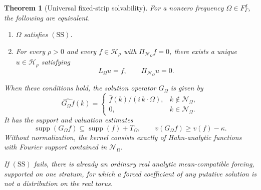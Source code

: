 \documentclass[11pt,letterpaper]{article}
\newtheorem{theorem}{Theorem}[section]
\theoremstyle{definition}
\theoremstyle{remark}
\newcommand{\HH}{\mathcal H}
\newcommand{\supp}{\operatorname{supp}}
\newcommand{\Lom}{L_{\Omega}}
\newcommand{\Gom}{G_{\Omega}}
\newcommand{\res}{\mathcal N_{\Omega}}
\newcommand{\SDcond}{\mathrm{SS}}
\numberwithin{equation}{section}
\begin{document}
\begin{theorem}[Universal fixed-strip solvability]\label{thm:linear}
For a nonzero frequency $\Omega\in F_\Gamma^d$, the following are equivalent.
\begin{enumerate}[label=(\roman*),leftmargin=*]
\item $\Omega$ satisfies $(\SDcond)$.
\item For every $\rho>0$ and every $f\in\HH_\rho$ with
$\Pi_{\res}f=0$, there exists a unique $u\in\HH_\rho$ satisfying
\[
 \Lom u=f,\qquad \Pi_{\res}u=0.
\]
\end{enumerate}
When these conditions hold, the solution operator $\Gom$ is given by
\begin{equation}\label{eq:green}
 \widehat{\Gom f}(k)=
 \begin{cases}
 \widehat f(k)/(i\,k\cdot\Omega),&k\notin\res,\\
 0,&k\in\res.
 \end{cases}
\end{equation}
It has the support and valuation estimates
\begin{equation}\label{eq:green-support}
 \supp(\Gom f)\subseteq\supp(f)+T_\Omega,
 \qquad v(\Gom f)\ge v(f)-\kappa.
\end{equation}
Without normalization, the kernel consists exactly of Hahn-analytic
functions with Fourier support contained in $\res$.

If $(\SDcond)$ fails, there is already an ordinary real analytic mean-compatible
forcing, supported on one stratum, for which a forced coefficient of any
putative solution is not a distribution on the real torus.
\end{theorem}
\end{document}
